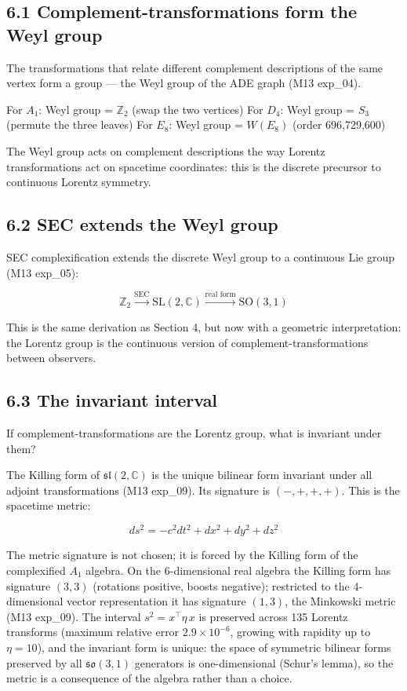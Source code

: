 \documentclass[11pt,a4paper]{article}
\begin{document}
\subsection*{6.1 Complement-transformations form the Weyl group}

The transformations that relate different complement descriptions of the same vertex form a group — the Weyl group of the ADE graph (M13 exp\_04).

For $A_1$: Weyl group = $\mathbb{Z}_2$ (swap the two vertices) For $D_4$: Weyl group = $S_3$ (permute the three leaves) For $E_8$: Weyl group = $W(E_8)$ (order 696,729,600)

The Weyl group acts on complement descriptions the way Lorentz transformations act on spacetime coordinates: this is the discrete precursor to continuous Lorentz symmetry.

\subsection*{6.2 SEC extends the Weyl group}

SEC complexification extends the discrete Weyl group to a continuous Lie group (M13 exp\_05):

\[\mathbb{Z}_2 \xrightarrow{\text{SEC}} \text{SL}(2, \mathbb{C}) \xrightarrow{\text{real form}} \text{SO}(3,1)\]

This is the same derivation as Section 4, but now with a geometric interpretation: the Lorentz group is the continuous version of complement-transformations between observers.

\subsection*{6.3 The invariant interval}

If complement-transformations are the Lorentz group, what is invariant under them?

The Killing form of $\mathfrak{sl}(2, \mathbb{C})$ is the unique bilinear form invariant under all adjoint transformations (M13 exp\_09). Its signature is $(-,+,+,+)$. This is the spacetime metric:

\[ds^2 = -c^2 dt^2 + dx^2 + dy^2 + dz^2\]

The metric signature is not chosen; it is forced by the Killing form of the complexified $A_1$ algebra. On the 6-dimensional real algebra the Killing form has signature $(3,3)$ (rotations positive, boosts negative); restricted to the 4-dimensional vector representation it has signature $(1,3)$, the Minkowski metric (M13 exp\_09). The interval $s^2 = x^{\top}\eta\,x$ is preserved across 135 Lorentz transforms (maximum relative error $2.9\times10^{-6}$, growing with rapidity up to $\eta=10$), and the invariant form is unique: the space of symmetric bilinear forms preserved by all $\mathfrak{so}(3,1)$ generators is one-dimensional (Schur's lemma), so the metric is a consequence of the algebra rather than a choice.
\end{document}
